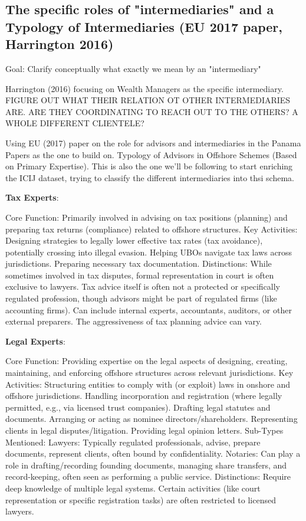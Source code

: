 \subsection{The specific roles of "intermediaries" and a Typology of Intermediaries (EU 2017 paper, Harrington 2016)}
\label{subsec:2_1_4}
Goal: Clarify conceptually what exactly we mean by an "intermediary"

Harrington (2016) focusing on Wealth Managers as the specific intermediary.
FIGURE OUT WHAT THEIR RELATION OT OTHER INTERMEDIARIES ARE. ARE THEY COORDINATING TO REACH OUT TO THE OTHERS? A WHOLE DIFFERENT CLIENTELE?

Using EU (2017) paper on the role for advisors and intermediaries in the Panama Papers as the one to build on. Typology of Advisors in Offshore Schemes (Based on Primary Expertise). This is also the one we'll be following to start enriching the ICIJ dataset, trying to classify the different intermediaries into thsi schema.

\textbf{Tax Experts}:

Core Function: Primarily involved in advising on tax positions (planning) and preparing tax returns (compliance) related to offshore structures.
Key Activities: Designing strategies to legally lower effective tax rates (tax avoidance), potentially crossing into illegal evasion. Helping UBOs navigate tax laws across jurisdictions. Preparing necessary tax documentation.
Distinctions: While sometimes involved in tax disputes, formal representation in court is often exclusive to lawyers. Tax advice itself is often not a protected or specifically regulated profession, though advisors might be part of regulated firms (like accounting firms). Can include internal experts, accountants, auditors, or other external preparers. The aggressiveness of tax planning advice can vary.

\textbf{Legal Experts}:

Core Function: Providing expertise on the legal aspects of designing, creating, maintaining, and enforcing offshore structures across relevant jurisdictions.
Key Activities: Structuring entities to comply with (or exploit) laws in onshore and offshore jurisdictions. Handling incorporation and registration (where legally permitted, e.g., via licensed trust companies). Drafting legal statutes and documents. Arranging or acting as nominee directors/shareholders. Representing clients in legal disputes/litigation. Providing legal opinion letters.
Sub-Types Mentioned:
Lawyers: Typically regulated professionals, advise, prepare documents, represent clients, often bound by confidentiality.
Notaries: Can play a role in drafting/recording founding documents, managing share transfers, and record-keeping, often seen as performing a public service.
Distinctions: Require deep knowledge of multiple legal systems. Certain activities (like court representation or specific registration tasks) are often restricted to licensed lawyers.

